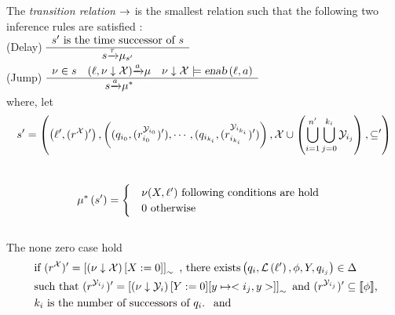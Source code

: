 \begin{definition}

The \emph{transition relation} $\rightarrow$ is the smallest relation such that the following two inference rules are satisfied : \\
(Delay)
$
    \begin{array}{c}
        s' \mbox{ is the time successor of } s \\
        \hline
        {s}{\xrightarrow{\tau}}{\mu_{s'}}
    \end{array}
$
\\
(Jump)
$
    \begin{array}{ccc}
        \nu \in s 
        &
        {\left (
                \ell, \nu \downarrow \mathcal{X}
            \right )}{\xrightarrow{a}}{\mu}
        &
        \nu \downarrow \mathcal{X} \models \mbox{\sl enab}\left( {\ell},{a} \right )
        \\
        \hline
        &
        {s}{\xrightarrow{a}}{\mu^*}
        &
    \end{array}
$
\\
where, let 
\\
$$
s' =  \left (
    \left (
        \ell',(r^{\mathcal{X}})'
    \right )
    ,
    \left (
        (q_{i_0},(r_{i_0}^{\mathcal{Y}_{i_0}})'),
        \cdots,
        (q_{i_{k_i}},(r_{i_{k_i}}^{\mathcal{Y}_{i_{k_i}}})')
    \right )
    ,
    \mathcal{X} \cup \left(
        \bigcup_{i=1}^{n'} \bigcup_{j=0}^{k_i} \mathcal{Y}_{i_j}
    \right )
    ,
    \subseteq'
\right )
$$
\\
\begin{align*}
    &
    \mu^* \left (
       s'
    \right )
    = 
    \begin{cases}
        & 
        \nu(X,\ell')
        \mbox{  following conditions are hold}
        \\
        & 
        0 
        \mbox{  otherwise }
    \end{cases}
\end{align*} 
\\
The none zero case hold
\begin{align*}
    &
    \mbox{ if } (r^{\mathcal{X}})' 
                    = 
                    \left[ \left (
                            \nu \downarrow \mathcal{X}
                        \right) [X := 0 ]
                    \right]_\sim 
    \mbox{ , there exists} \left (
        q_i,
        \mathcal{L}\left(\ell'\right),
        \phi,
        Y,
        q_{i_j}
    \right) \in \Delta
    \\
    &
    \mbox{ such that }
    (r^{\mathcal{Y}_{i_j}})' 
        = 
        \left[ \left (
                \nu \downarrow \mathcal{Y}_{i}
            \right) [Y := 0 ] [y \mapsto <i_j,y>]
        \right]_\sim 
    \mbox{ and }
    (r^{\mathcal{Y}_{i_j}})' \subseteq {\llbracket}{\phi}{\rrbracket}
    \mbox{,}
    \\
    &
    \mbox { $ k_i $ is the number of successors of $ q_i $. } 
    \mbox { and } 
\end{align*} 


\end{definition}
